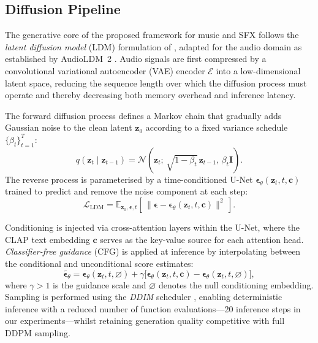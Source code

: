 \documentclass[journal]{IEEEtran}
\begin{document}
\subsection{Diffusion Pipeline}
\label{sec:diffusion}

The generative core of the proposed framework for music and SFX
follows the \textit{latent diffusion model} (LDM) formulation of
\cite{rombach2022ldm}, adapted for the audio domain as established
by AudioLDM~2 \cite{liu2024audioldm2}. Audio signals are first
compressed by a convolutional variational autoencoder (VAE) encoder
$\mathcal{E}$ into a low-dimensional latent space, reducing the
sequence length over which the diffusion process must operate and
thereby decreasing both memory overhead and inference latency.

The forward diffusion process defines a Markov chain that gradually
adds Gaussian noise to the clean latent $\mathbf{z}_0$ according to
a fixed variance schedule $\{\beta_t\}_{t=1}^{T}$:
\begin{equation}
  q(\mathbf{z}_t \mid \mathbf{z}_{t-1}) =
  \mathcal{N}\!\left(\mathbf{z}_t;\,\sqrt{1-\beta_t}\,\mathbf{z}_{t-1},\,
  \beta_t\mathbf{I}\right).
  \label{eq:forward}
\end{equation}
The reverse process is parameterised by a time-conditioned U-Net
$\boldsymbol{\epsilon}_\theta(\mathbf{z}_t, t, \mathbf{c})$ trained to
predict and remove the noise component at each step:
\begin{equation}
  \mathcal{L}_{\text{LDM}} =
  \mathbb{E}_{\mathbf{z}_0, \boldsymbol{\epsilon}, t}
  \left[\,
    \bigl\|\boldsymbol{\epsilon} -
    \boldsymbol{\epsilon}_\theta(\mathbf{z}_t, t, \mathbf{c})
    \bigr\|^2
  \,\right].
  \label{eq:ldm_loss}
\end{equation}

Conditioning is injected via cross-attention layers within the U-Net,
where the CLAP text embedding $\mathbf{c}$ serves as the key-value
source for each attention head. \textit{Classifier-free guidance}
(CFG) \cite{ho2022cfg} is applied at inference by interpolating
between the conditional and unconditional score estimates:
\begin{equation}
  \tilde{\boldsymbol{\epsilon}_\theta} =
  \boldsymbol{\epsilon}_\theta(\mathbf{z}_t, t, \varnothing)
  + \gamma \bigl[
    \boldsymbol{\epsilon}_\theta(\mathbf{z}_t, t, \mathbf{c})
    - \boldsymbol{\epsilon}_\theta(\mathbf{z}_t, t, \varnothing)
  \bigr],
  \label{eq:cfg}
\end{equation}
where $\gamma > 1$ is the guidance scale and $\varnothing$ denotes the
null conditioning embedding. Sampling is performed using the
\textit{DDIM} scheduler \cite{song2021ddim}, enabling deterministic
inference with a reduced number of function evaluations---20 inference
steps in our experiments---whilst retaining generation quality
competitive with full DDPM sampling.
\end{document}
